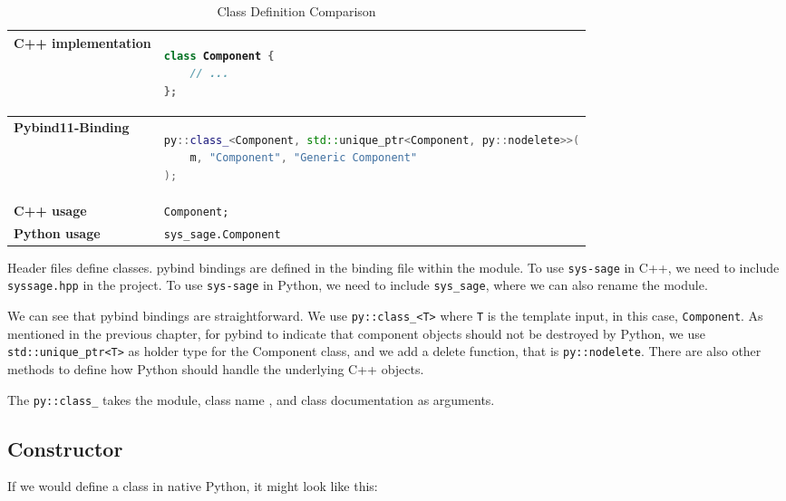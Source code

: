 \begin{table}[htbp]
\centering
\begin{tabular}{|l|l|}
\hline
\textbf{C++ implementation} &
\begin{lstlisting}[language=C++]
class Component {
    // ...
};
\end{lstlisting}
\\ \hline
\textbf{Pybind11-Binding} &
\begin{lstlisting}[language=C++]
py::class_<Component, std::unique_ptr<Component, py::nodelete>>(
    m, "Component", "Generic Component"
);
\end{lstlisting}
\\ \hline
\textbf{C++ usage} &
\verb|Component;| \\ \hline
\textbf{Python usage} &
\verb|sys_sage.Component| \\ \hline
\end{tabular}
\caption{Class Definition Comparison}
\label{tab:class_definition}
\end{table}

Header files define classes. pybind bindings are defined in the binding file within the module. To use \verb|sys-sage| in C++, we need to include \verb|syssage.hpp| in the project. To use \verb|sys-sage| in Python, we need to include \verb|sys_sage|, where we can also rename the module.

We can see that pybind bindings are straightforward. We use \verb|py::class_<T>| where \verb|T| is the template input, in this case, \verb|Component|. As mentioned in the previous chapter, for pybind to indicate that component objects should not be destroyed by Python, we use \verb|std::unique_ptr<T>| as holder type for the Component class, and we add a delete function, that is \verb|py::nodelete|. There are also other methods to define how Python should handle the underlying C++ objects.

The \verb|py::class_| takes the module, class name , and class documentation as arguments.


\subsection{Constructor}

If we would define a class in native Python, it might look like this:

